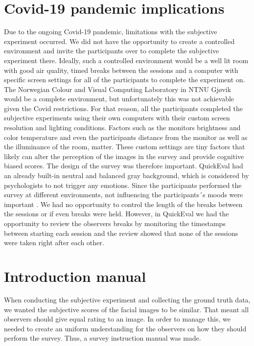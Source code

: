 \section{Covid-19 pandemic implications}
Due to the ongoing Covid-19 pandemic, limitations with the subjective experiment occurred. We did not have the opportunity to create a controlled environment and invite the participants over to complete the subjective experiment there. Ideally, such a controlled environment would be a well lit room with good air quality, timed breaks between the sessions and a computer with specific screen settings for all of the participants to complete the experiment on. The Norwegian Colour and Visual Computing Laboratory in NTNU Gjøvik would be a complete environment, but unfortunately this was not achievable given the Covid restrictions. For that reason, all the participants completed the subjective experiments using their own computers with their custom screen resolution and lighting conditions. Factors such as the monitors brightness and color temperature and even the participants distance from the monitor as well as the illuminance of the room, matter. These custom settings are tiny factors that likely can alter the perception of the images in the survey and provide cognitive biased scores. The design of the survey was therefore important. QuickEval had an already built-in neutral and balanced gray background, which is considered by psychologists to not trigger any emotions. Since the participants performed the survey at different environments, not influencing the participants´s moods were important \cite{grayBackground}. We had no opportunity to control the length of the breaks between the sessions or if even breaks were held. However, in QuickEval we had the opportunity to review the observers breaks by monitoring the timestamps between starting each session and the review showed that none of the sessions were taken right after each other.  

\section{Introduction manual}
\label{sec:intromanual}
When conducting the subjective experiment and collecting the ground truth data, we wanted the subjective scores of the facial images to be similar. That meant all observers should give equal rating to an image. In order to manage this, we needed to create an uniform understanding for the observers on how they should perform the survey. Thus, a survey instruction manual was made. 

